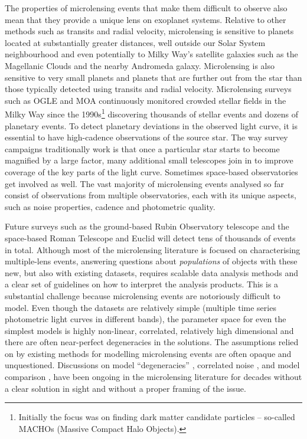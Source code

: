 \documentclass[12pt,dvipsnames]{report}
\begin{document}
The properties of microlensing events that make them difficult to observe also mean
that they provide a unique lens on exoplanet systems. 
Relative to other methods such as transits and radial velocity, microlensing is sensitive
to planets located at substantially greater distances, well outside our
Solar System neighbourhood and even potentially to Milky Way's satellite
galaxies such as the Magellanic Clouds and the nearby Andromeda galaxy.
Microlensing is also sensitive to very small planets and planets that 
are further out from the star than those typically detected using transits and
radial velocity. Microlensing surveys such as OGLE \citep{1993AcA....43..289U}
and MOA \citep{1999PThPS.133..233M} continuously monitored crowded
stellar fields in the Milky Way since the 1990s\footnote{Initially the focus was
    on finding dark matter candidate particles -- so-called MACHOs (Massive Compact
    Halo Objects).} discovering thousands of stellar events and dozens of planetary
events. To detect planetary deviations in the observed light curve, it is
essential to have high-cadence observations of the source star. The way survey campaigns
traditionally work is that once a particular star starts to become
magnified by a large factor, many additional small telescopes join in to improve 
coverage of the key parts of the light curve. Sometimes space-based observatories 
get involved as well.
The vast majority of microlensing events analysed so far consist of
observations from multiple observatories, each with its unique aspects, such
as noise properties, cadence and photometric quality.

Future surveys such as the ground-based Rubin Observatory
\citep{2019ApJ...873..111I} telescope and the space-based Roman Telescope
\citep{2019ApJS..241....3P} and Euclid \citep{2022arXiv220209475B} will detect
tens of thousands of events in total. Although most of the microlensing literature 
is focused on characterising multiple-lens events, answering
questions about \emph{populations} of objects with these new, but also with existing datasets,
requires scalable data analysis methods and a clear set of
guidelines on how to interpret the analysis products. This is a substantial
challenge because microlensing events are notoriously difficult to model. Even
though the datasets are relatively simple (multiple time series
photometric light curves in different bands), the parameter space for even the
simplest models is highly non-linear, correlated, relatively high dimensional
and there are often near-perfect degeneracies in the solutions.
The assumptions relied on by existing methods for modelling microlensing events 
are often opaque and unquestioned. Discussions on model ``degeneracies''
\citep{2014MNRAS.437.4006S,2019AJ....157...23H,2018AcA....68...43S,2009MNRAS.393..816D},
correlated noise \citep{2015ApJ...812..136B,2019MNRAS.488.3308L}, and model
comparison \citep{2018AJ....155..259H,2019MNRAS.484.5608D}, have been ongoing in
the microlensing literature for decades without a clear solution in sight and without a proper
framing of the issue. 
\end{document}
